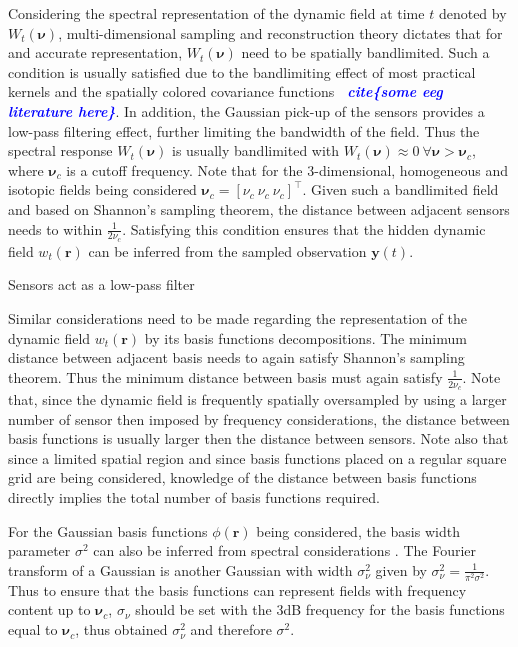 \documentclass[onecolumn,draftcls]{IEEEtran}
\newcommand{\todo}[1]{\textsf{\emph{\textbf{\textcolor{blue}{#1}}}}}
\begin{document}
Considering the spectral representation of the dynamic field at time $t$ denoted by $W_t(\boldsymbol{\nu})$, multi-dimensional sampling and reconstruction theory dictates that for and accurate representation, $W_t(\boldsymbol{\nu})$ need to be spatially bandlimited. Such a condition is usually satisfied due to the bandlimiting effect of most practical kernels and the spatially colored covariance functions \todo{~cite\{some eeg literature here\}}. In addition, the Gaussian pick-up of the sensors provides a low-pass filtering effect, further limiting the bandwidth of the field. Thus the spectral response $W_t(\boldsymbol{\nu})$ is usually bandlimited with $W_t(\boldsymbol{\nu}) \approx 0 ~ \forall \boldsymbol{\nu} > \boldsymbol{\nu}_c$, where $\boldsymbol{\nu}_c$ is a cutoff frequency. Note that for the 3-dimensional, homogeneous and isotopic fields being considered $\boldsymbol{\nu}_c = [\nu_c ~ \nu_c ~ \nu_c]^\top$. Given such a bandlimited field and based on Shannon's sampling theorem, the distance between adjacent sensors needs to within $\frac{1}{2\nu_c}$. Satisfying this condition ensures that the hidden dynamic field $w_t(\mathbf{r})$ can be inferred from the sampled observation $\mathbf{y}(t)$.

Sensors act as a low-pass filter 

Similar considerations need to be made regarding the representation of the dynamic field $w_t(\mathbf{r})$ by its basis functions decompositions. The minimum distance between adjacent basis needs to again satisfy Shannon's sampling theorem. Thus the minimum distance between basis must again satisfy $\frac{1}{2\nu_c}$. Note that, since the dynamic field is frequently spatially oversampled by using a larger number of sensor then imposed by frequency considerations, the distance between basis functions is usually larger then the distance between sensors. Note also that since a limited spatial region and since basis functions placed on a regular square grid are being considered, knowledge of the distance between basis functions directly implies the total number of basis functions required. 

For the Gaussian basis functions $\phi(\mathbf{r})$ being considered, the basis width parameter $\sigma^2$ can also be inferred from spectral considerations \cite{Sanner1992,Scerri2009}. The Fourier transform of a Gaussian is another Gaussian with width $\sigma^2_{\nu}$ given by $\sigma^2_{\nu} = \frac{1}{\pi^2\sigma^2}$. Thus to ensure that the basis functions can represent fields with frequency content up to $\boldsymbol{\nu}_c$, $\sigma_{\nu}$ should be set with the 3dB frequency for the basis functions equal to $\boldsymbol{\nu}_c$, thus obtained $\sigma^2_{\nu}$ and therefore $\sigma^2$. 
\end{document}
